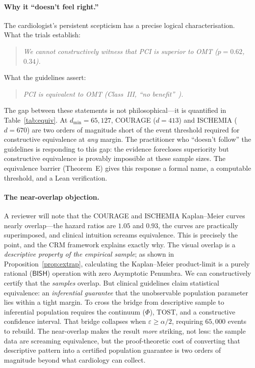 \documentclass[11pt,a4paper]{article}
\theoremstyle{plain}
\theoremstyle{definition}
\newcommand{\BISH}{\textsf{BISH}}
\renewcommand{\Phi}{\varPhi}
\begin{document}
\paragraph{Why it ``doesn't feel right.''}  The cardiologist's persistent scepticism has a precise logical characterisation.  What the trials establish:
\begin{quote}
\emph{We cannot constructively witness that PCI is superior to OMT ($p = 0.62$, $0.34$).}
\end{quote}
What the guidelines assert:
\begin{quote}
\emph{PCI is equivalent to OMT (Class~III, ``no benefit''~\cite{acc-aha-cad}).}
\end{quote}
The gap between these statements is not philosophical---it is quantified in Table~\ref{tab:equiv}.  At $d_{\min} = 65{,}127$, COURAGE ($d = 413$) and ISCHEMIA ($d = 670$) are two orders of magnitude short of the event threshold required for constructive equivalence at \emph{any} margin.  The practitioner who ``doesn't follow'' the guidelines is responding to this gap: the evidence forecloses superiority but constructive equivalence is provably impossible at these sample sizes.  The equivalence barrier (Theorem~E) gives this response a formal name, a computable threshold, and a Lean verification.

\paragraph{The near-overlap objection.}  A reviewer will note that the COURAGE and ISCHEMIA Kaplan--Meier curves nearly overlap---the hazard ratios are $1.05$ and $0.93$, the curves are practically superimposed, and clinical intuition screams equivalence.  This is precisely the point, and the CRM framework explains exactly why.  The visual overlap is a \emph{descriptive property of the empirical sample}; as shown in Proposition~\ref{prop:extrap}, calculating the Kaplan--Meier product-limit is a purely rational ($\BISH$) operation with zero Asymptotic Penumbra.  We can constructively certify that the \emph{samples} overlap.  But clinical guidelines claim statistical equivalence: an \emph{inferential guarantee} that the unobservable population parameter lies within a tight margin.  To cross the bridge from descriptive sample to inferential population requires the continuum ($\Phi$), TOST, and a constructive confidence interval.  That bridge collapses when $\varepsilon \geq \alpha/2$, requiring $65{,}000$ events to rebuild.  The near-overlap makes the result \emph{more} striking, not less: the sample data are screaming equivalence, but the proof-theoretic cost of converting that descriptive pattern into a certified population guarantee is two orders of magnitude beyond what cardiology can collect.
\end{document}
